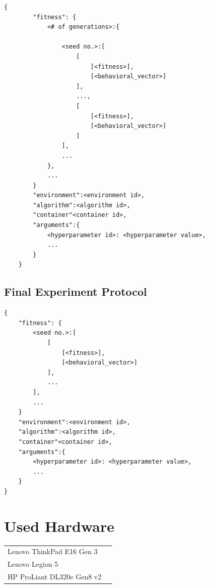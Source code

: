 \documentclass[final,12pt,a4paper]{report}
\let\openright=\clearpage
\begin{document}
\begin{lstlisting}[tabsize=3]
	{
		"fitness": {
			<# of generations>:{
			
				<seed no.>:[
					[
						[<fitness>], 
						[<behavioral_vector>]
					],
					...,
					[
						[<fitness>], 
						[<behavioral_vector>]
					]
				],
				...
			},
			...
		}
		"environment":<environment id>,
		"algorithm":<algorithm id>,
		"container"<container id>,
		"arguments":{
			<hyperparameter id>: <hyperparameter value>,
			...
		}
	}
\end{lstlisting}
\subsection{Final Experiment Protocol}
\begin{lstlisting}[tabsize=3]
{
	"fitness": {
		<seed no.>:[
			[
				[<fitness>], 
				[<behavioral_vector>]
			],
			...
		],
		...
	}
	"environment":<environment id>,
	"algorithm":<algorithm id>,
	"container"<container id>,
	"arguments":{
		<hyperparameter id>: <hyperparameter value>,
		...
	}
}
\end{lstlisting}
\section{Used Hardware}
\label{app:computers}

\begin{tabular}{ll}
	Lenovo ThinkPad E16 Gen 3 \\
	Lenovo Legion 5\\
	HP ProLiant DL320e Gen8 v2 \\
	
\end{tabular}


\openright
\end{document}
